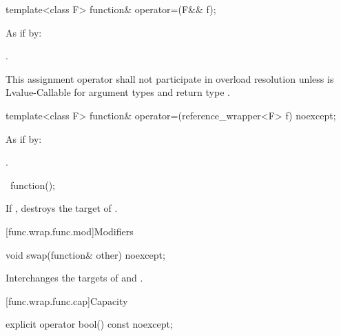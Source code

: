 %
\begin{itemdecl}
template<class F> function& operator=(F&& f);
\end{itemdecl}

\begin{itemdescr}
\pnum\effects As if by: 

\pnum\returns {}.

\pnum\remarks This assignment operator shall not participate in overload
resolution unless  is
Lvalue-Callable for argument types  and
return type .
\end{itemdescr}

%
\begin{itemdecl}
template<class F> function& operator=(reference_wrapper<F> f) noexcept;
\end{itemdecl}

\begin{itemdescr}
\pnum\effects As if by: 

\pnum
\returns {}.
\end{itemdescr}

%
\begin{itemdecl}
~function();
\end{itemdecl}

\begin{itemdescr}
\pnum\effects If , destroys the target of .
\end{itemdescr}

[func.wrap.func.mod]{Modifiers}

%
\begin{itemdecl}
void swap(function& other) noexcept;
\end{itemdecl}

\begin{itemdescr}
\pnum\effects Interchanges the targets of  and .
\end{itemdescr}

[func.wrap.func.cap]{Capacity}

%
\begin{itemdecl}
explicit operator bool() const noexcept;
\end{itemdecl}


